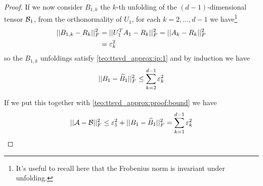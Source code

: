 \begin{Teo}
\begin{proof}
    If we now consider $B_{1,k}$ the $k$-th unfolding of the $(d-1)$-dimensional tensor $\mathcal{B}_1$, from the orthonormality of $U_1$, for each $k=2,\ldots,d-1$ we have\footnote{It's useful to recall here that the Frobenius norm is invariant under unfolding.}
    \begin{equation*}
      \begin{split}
        ||B_{1,k} - R_k||_F^2 &= ||U_1^T A_1 - R_k||_F^2 = ||A_k - R_k||_F^2\\
         &= \varepsilon_k^2
      \end{split}
    \end{equation*}
    so the $B_{1,k}$ unfoldings satisfy \ref{teo:ttsvd_approx:ip:1} and by induction we have
    \begin{equation*}
      ||B_1 - \widehat{B}_1 ||_F^2 \le \sum_{k=2}^{d-1} \varepsilon_k^2
    \end{equation*}

    If we put this together with \ref{teo:ttsvd_approx:proof:bound} we have
    \begin{equation*}
      ||\mathcal{A} - \mathcal{B}||_F^2 \le \varepsilon_1^2 + ||B_1 - \widehat{B}_1 ||_F^2 = \sum_{k=1}^{d-1} \varepsilon_k^2
    \end{equation*}
  \end{proof}
\end{Teo}

